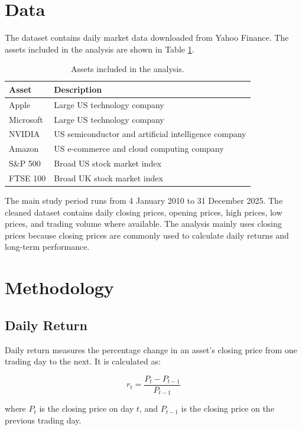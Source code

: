\documentclass[12pt,a4paper]{article}
\begin{document}
\section{Data}

The dataset contains daily market data downloaded from Yahoo Finance. The assets included in the analysis are shown in Table \ref{tab:assets}.

\begin{table}[H]
\centering
\begin{tabular}{ll}
\toprule
Asset & Description \\
\midrule
Apple & Large US technology company \\
Microsoft & Large US technology company \\
NVIDIA & US semiconductor and artificial intelligence company \\
Amazon & US e-commerce and cloud computing company \\
S\&P 500 & Broad US stock market index \\
FTSE 100 & Broad UK stock market index \\
\bottomrule
\end{tabular}
\caption{Assets included in the analysis.}
\label{tab:assets}
\end{table}

The main study period runs from 4 January 2010 to 31 December 2025. The cleaned dataset contains daily closing prices, opening prices, high prices, low prices, and trading volume where available. The analysis mainly uses closing prices because closing prices are commonly used to calculate daily returns and long-term performance.

\section{Methodology}

\subsection{Daily Return}

Daily return measures the percentage change in an asset's closing price from one trading day to the next. It is calculated as:

\begin{equation}
    r_t = \frac{P_t - P_{t-1}}{P_{t-1}}
\end{equation}

where \(P_t\) is the closing price on day \(t\), and \(P_{t-1}\) is the closing price on the previous trading day.
\end{document}
